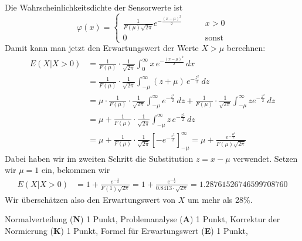 \begin{loesung}
Die Wahrscheinlichkeitsdichte der Sensorwerte ist
\[
\varphi(x)=\begin{cases}
\displaystyle
\frac1{F(\mu)\sqrt{2\pi}}e^{-\frac{(x-\mu)^2}2}&\qquad x > 0\\
0&\qquad\text{sonst}
\end{cases}
\]
Damit kann man jetzt den Erwartungswert der Werte $X>\mu$ berechnen:
\begin{align*}
E(X| X > 0)
&=
\frac1{F(\mu)}\cdot\frac1{\sqrt{2\pi}}\int_0^\infty x\,e^{-\frac{(x-\mu)^2}2}\,dx
\\
&=
\frac1{F(\mu)}\cdot\frac1{\sqrt{2\pi}}\int_{-\mu}^\infty (z+\mu)\,e^{-\frac{z^2}2}\,dz
\\
&=
\mu\cdot \frac{1}{F(\mu)}\cdot\frac1{\sqrt{2\pi}}\int_{-\mu}^\infty e^{-\frac{z^2}2}\,dz
+
\frac1{F(\mu)}\cdot\frac1{\sqrt{2\pi}}\int_{-\mu}^\infty ze^{-\frac{z^2}2}\,dz
\\
&=
\mu + \frac1{F(\mu)}\cdot\frac1{\sqrt{2\pi}}\int_{-\mu}^\infty z\,e^{-\frac{z^2}2}\,dz
\\
&=
\mu + \frac1{F(\mu)}
\cdot\frac1{\sqrt{2\pi}}
\left[
-e^{-\frac{z^2}2}
\right]_{-\mu}^\infty
=\mu + \frac{e^{-\frac{\mu^2}2}}{F(\mu)\sqrt{2\pi}}
\end{align*}
Dabei haben wir im zweiten Schritt die Substitution $z=x-\mu$ verwendet.
Setzen wir $\mu=1$ ein, bekommen wir
\begin{align*}
E(X|X>0)
&
=
1+\frac{e^{-\frac12}}{F(1)\sqrt{2\pi}}
=
1+\frac{e^{-\frac12}}{0.8413\cdot \sqrt{2\pi}}=1.28761526746599708760
\end{align*}
Wir überschätzen also den Erwartungswert von $X$ um mehr als 28\%.
\end{loesung}

\begin{bewertung}
Normalverteilung ({\bf N}) 1 Punkt,
Problemanalyse ({\bf A}) 1 Punkt,
Korrektur der Normierung ({\bf K}) 1 Punkt,
Formel für Erwartungswert ({\bf E}) 1 Punkt,
\end{bewertung}

